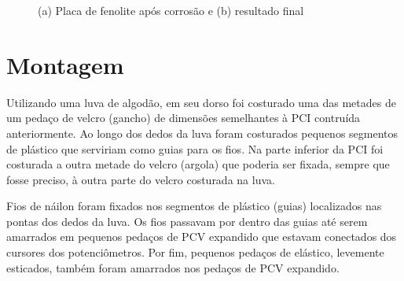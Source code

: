\documentclass[
	12pt,				%
	openright,			%
	oneside,			%
	a4paper,			%
	english,			%
	brazil				%
	]{abntex2}
\begin{document}
	\begin{figure}[!htb]
		 \centering
		 \caption{ (a) Placa de fenolite após corrosão e (b) resultado final} 
		 \centering
		 \label{Fig:phenolic-and-ready}
	\end{figure}

		\section{Montagem}

		Utilizando uma luva de algodão, em seu dorso foi costurado uma das metades de um pedaço de velcro (gancho) de dimensões semelhantes à PCI contruída anteriormente. Ao longo dos dedos da luva foram costurados pequenos segmentos de plástico que serviriam como guias para os fios.	Na parte inferior da PCI foi costurada a outra metade do velcro (argola) que poderia ser fixada, sempre que fosse preciso, à outra parte do velcro costurada na luva.

		Fios de náilon foram fixados nos segmentos de plástico (guias) localizados nas pontas dos dedos da luva. Os fios passavam por dentro das guias até serem amarrados em pequenos pedaços de PCV expandido que estavam conectados dos cursores dos potenciômetros. Por fim, pequenos pedaços de elástico, levemente esticados, também foram amarrados nos pedaços de PCV expandido.
\end{document}
